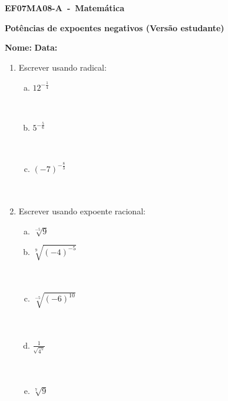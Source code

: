 \documentclass[a4paper,14pt]{article}
\begin{document}
	
	\noindent\textbf{EF07MA08-A~-~Matemática} 
	
	\begin{center}
		\textbf{Potências de expoentes negativos (Versão estudante)}
	\end{center}
	
	
	\noindent\textbf{Nome:} \underline{\hspace{10cm}}
    \noindent\textbf{Data:} \underline{\hspace{4cm}}
	
	
	\begin{multicols}{2}
	\begin{enumerate}	
		\item Escrever usando radical:
		\begin{enumerate}[a)]
			\item $12^{-\frac{1}{4}}$ \\\\\\
			\item $5^{-\frac{5}{6}}$ \\\\\\
			\item $(-7)^{-\frac{8}{3}}$ \\\\\\
	    \end{enumerate}
        \item Escrever usando expoente racional:
        \begin{enumerate}[a)]
        	\item $\sqrt[-5]{9}$ \\
        	\item $\sqrt[9]{(-4)^{-5}}$ \\\\\\
        	\item $\sqrt[-5]{(-6)^{10}}$ \\\\\\
        	\item $\frac{1}{\sqrt{4^5}}$ \\\\\\
        	\item $\sqrt[7]{9}$ \\\\\\

\end{enumerate}
\end{enumerate}
\end{multicols}
\end{document}
